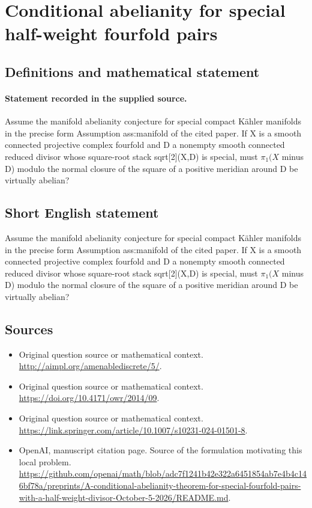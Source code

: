 \documentclass[11pt]{article}
\begin{document}
\section*{Conditional abelianity for special half-weight fourfold pairs}\label{30007024}
\subsection{Definitions and mathematical statement}
\paragraph{Statement recorded in the supplied source.}
Assume the manifold abelianity conjecture for special compact Kähler manifolds in the precise form Assumption ass:manifold of the cited paper. If X is a smooth connected projective complex fourfold and D a nonempty smooth connected reduced divisor whose square-root stack sqrt[2](X,D) is special, must $\pi _{1}(X$ minus D) modulo the normal closure of the square of a positive meridian around D be virtually abelian?
\subsection{Short English statement}
Assume the manifold abelianity conjecture for special compact Kähler manifolds in the precise form Assumption ass:manifold of the cited paper. If X is a smooth connected projective complex fourfold and D a nonempty smooth connected reduced divisor whose square-root stack sqrt[2](X,D) is special, must $\pi _{1}(X$ minus D) modulo the normal closure of the square of a positive meridian around D be virtually abelian?
\subsection{Sources}
\begin{itemize}
\item[S1] Original question source or mathematical context.
\url{http://aimpl.org/amenablediscrete/5/}.
\item[S2] Original question source or mathematical context.
\url{https://doi.org/10.4171/owr/2014/09}.
\item[S3] Original question source or mathematical context.
\url{https://link.springer.com/article/10.1007/s10231-024-01501-8}.
\item[S4] OpenAI, manuscript citation page. Source of the formulation motivating this local problem.
\url{https://github.com/openai/math/blob/adc7f1241b42e322a6451854ab7e4b4c146bf78a/preprints/A-conditional-abelianity-theorem-for-special-fourfold-pairs-with-a-half-weight-divisor-October-5-2026/README.md}.
\end{itemize}
\end{document}
